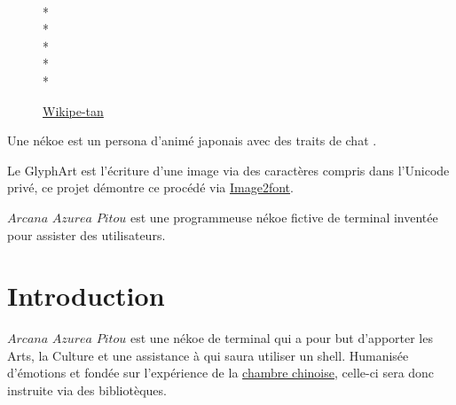 \documentclass{report}
\newcommand{\name}{\textit{Arcana Azurea Pitou}}
\begin{document}
\begin{figure}[!ht]
  \begin{minipage}{1in}
    \centering
    \fontsize{30pt}{7pt}\selectfont
    \\*
    \\*
    \\*
    \\*
    \\*
  \end{minipage}
  \caption[Caption for LOF]{\href{https://en.wikipedia.org/wiki/Wikipedia:Wikipe-tan}{Wikipe-tan} \textendash{ }}
\end{figure}

Une nékoe \textendash{ } est un persona d'animé japonais avec des traits de chat
 \textendash.

Le GlyphArt est l'écriture d'une image via des caractères compris dans l'Unicode privé, ce projet démontre ce procédé via
\href{https://limaconoob.github.io/Image2font}{Image2font}.

$\name$ est une programmeuse nékoe fictive de terminal inventée pour assister des utilisateurs.

\section{Introduction}
\thispagestyle{empty}
$\name$ est une nékoe de terminal qui a pour but d'apporter les Arts, la Culture et une assistance à qui saura utiliser un shell.
Humanisée d’émotions et fondée sur l'expérience de la \href{https://fr.wikipedia.org/wiki/Chambre_chinoise}{chambre chinoise}, celle-ci sera donc instruite via des bibliotèques.
\end{document}
